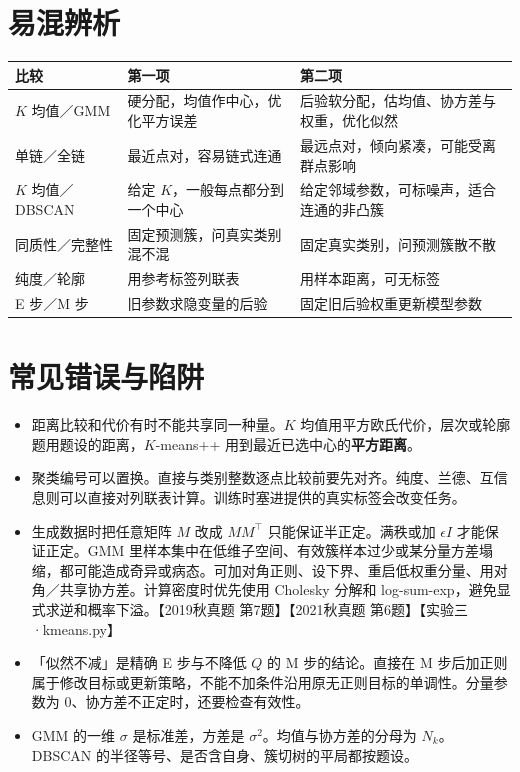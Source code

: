 \documentclass[UTF8,a4paper,zihao=-4,fontset=fandol]{ctexrep}
\begin{document}
\section{易混辨析}

\begin{tabularx}{\linewidth}{@{}p{.22\linewidth}XX@{}}
\toprule
比较 & 第一项 & 第二项\\
\midrule
$K$ 均值／GMM & 硬分配，均值作中心，优化平方误差 & 后验软分配，估均值、协方差与权重，优化似然\\
单链／全链 & 最近点对，容易链式连通 & 最远点对，倾向紧凑，可能受离群点影响\\
$K$ 均值／DBSCAN & 给定 $K$，一般每点都分到一个中心 & 给定邻域参数，可标噪声，适合连通的非凸簇\\
同质性／完整性 & 固定预测簇，问真实类别混不混 & 固定真实类别，问预测簇散不散\\
纯度／轮廓 & 用参考标签列联表 & 用样本距离，可无标签\\
E 步／M 步 & 旧参数求隐变量的后验 & 固定旧后验权重更新模型参数\\
\bottomrule
\end{tabularx}

\section{常见错误与陷阱}
\begin{itemize}
\item 距离比较和代价有时不能共享同一种量。$K$ 均值用平方欧氏代价，层次或轮廓题用题设的距离，$K$-means++ 用到最近已选中心的\textbf{平方距离}。
\item 聚类编号可以置换。直接与类别整数逐点比较前要先对齐。纯度、兰德、互信息则可以直接对列联表计算。训练时塞进提供的真实标签会改变任务。
\item 生成数据时把任意矩阵 $M$ 改成 $MM^\top$ 只能保证半正定。满秩或加 $\epsilon I$ 才能保证正定。GMM 里样本集中在低维子空间、有效簇样本过少或某分量方差塌缩，都可能造成奇异或病态。可加对角正则、设下界、重启低权重分量、用对角／共享协方差。计算密度时优先使用 Cholesky 分解和 log-sum-exp，避免显式求逆和概率下溢。【2019秋真题 第7题】【2021秋真题 第6题】【实验三·kmeans.py】
\item 「似然不减」是精确 E 步与不降低 $Q$ 的 M 步的结论。直接在 M 步后加正则属于修改目标或更新策略，不能不加条件沿用原无正则目标的单调性。分量参数为 0、协方差不正定时，还要检查有效性。
\item GMM 的一维 $\sigma$ 是标准差，方差是 $\sigma^2$。均值与协方差的分母为 $N_k$。DBSCAN 的半径等号、是否含自身、簇切树的平局都按题设。
\end{itemize}
\end{document}
